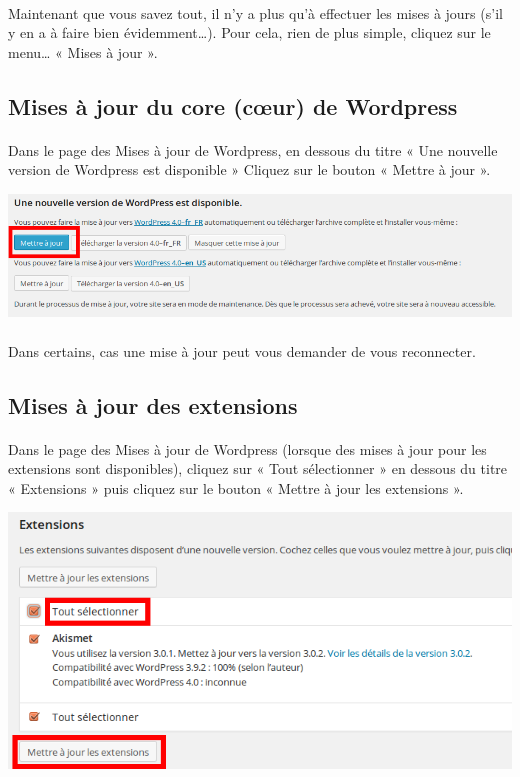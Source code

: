 \documentclass[10pt,a4paper]{article}
\begin{document}
\paragraph{}Maintenant que vous savez tout, il n'y a plus qu'à effectuer les mises à jours (s'il y en a à faire bien évidemment…). Pour cela, rien de plus simple, cliquez sur le menu… « Mises à jour ».
\subsection{Mises à jour du core (cœur) de Wordpress}
\paragraph{}Dans le page des Mises à jour de Wordpress, en dessous du titre « Une nouvelle version de Wordpress est disponible » Cliquez sur le bouton « Mettre à jour ».
\begin{center}
\includegraphics[scale=0.35]{img/0052.png}
\end{center}
\paragraph{}Dans certains, cas une mise à jour peut vous demander de vous reconnecter.
\subsection{Mises à jour des extensions}
\paragraph{}Dans le page des Mises à jour de Wordpress (lorsque des mises à jour pour les extensions sont disponibles), cliquez sur « Tout sélectionner » en dessous du titre « Extensions » puis cliquez sur le bouton « Mettre à jour les extensions ».
\begin{center}
\includegraphics[scale=0.35]{img/0053.png}
\end{center}
\end{document}

